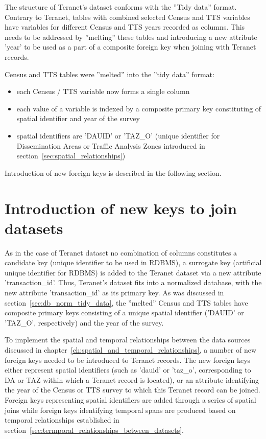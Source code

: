 \vspace{5mm}

The structure of Teranet's dataset conforms with the ''Tidy data'' format.
Contrary to Teranet, tables with combined selected Census and TTS variables have variables for different Census and TTS years recorded as columns.
This needs to be addressed by ''melting'' these tables and introducing a new attribute 'year' to be used as a part of a composite foreign key when joining with Teranet records.

\vspace{5mm}

Census and TTS tables were ''melted'' into the ''tidy data'' format:
\begin{itemize}
    \item each Census / TTS variable now forms a single column
    \item each value of a variable is indexed by a composite primary key constituting of spatial identifier and year of the survey
    \item spatial identifiers are 'DAUID' or 'TAZ\_O' (unique identifier for Dissemination Areas or Traffic Analysis Zones introduced in section~\ref{sec:spatial_relationships})
\end{itemize}

Introduction of new foreign keys is described in the following section.

\section{Introduction of new keys to join datasets} \label{sec:introduction_of_new_keys}

As in the case of Teranet dataset no combination of columns constitutes a candidate key (unique identifier to be used in RDBMS), a surrogate key (artificial unique identifier for RDBMS) is added to the Teranet dataset via a new attribute 'transaction\_id'.
Thus, Teranet's dataset fits into a normalized database, with the new attribute 'transaction\_id' as its primary key.
As was discussed in section~\ref{sec:db_norm_tidy_data}, the ''melted'' Census and TTS tables have composite primary keys consisting of a unique spatial identifier ('DAUID' or 'TAZ\_O', respectively) and the year of the survey.

To implement the spatial and temporal relationships between the data sources discussed in chapter~\ref{ch:spatial_and_temporal_relationships}, a number of new foreign keys needed to be introduced to Teranet records.
The new foreign keys either represent spatial identifiers (such as 'dauid' or 'taz\_o', corresponding to DA or TAZ within which a Teranet record is located), or an attribute identifying the year of the Census or TTS survey to which this Teranet record can be joined.
Foreign keys representing spatial identifiers are added through a series of spatial joins while foreign keys identifying temporal spans are produced based on temporal relationships established in section~\ref{sec:termporal_relationships_between_datasets}.

